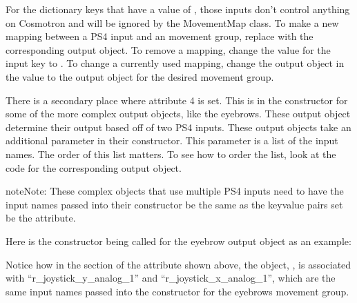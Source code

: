 \documentclass[letterpaper,10pt,english]{sphinxmanual}
\begin{document}
\sphinxAtStartPar
For the dictionary keys that have a value of , those inputs
don’t control anything on Cosmotron and will be ignored by the
MovementMap class. To make a new mapping between a PS4 input and an
movement group, replace  with the corresponding output object.
To remove a mapping, change the value for the input key to .
To change a currently used mapping, change the output object in the
value to the output object for the desired movement group.

\sphinxAtStartPar
There is a secondary place where attribute 4 is set. This is in the
constructor for some of the more complex output objects, like the
eyebrows. These output object determine their output based off of
two PS4 inputs. These output objects take an additional parameter in
their constructor. This parameter is a list of the input names. The
order of this list matters. To see how to order the list, look at
the code for the corresponding output object.

\begin{sphinxadmonition}{note}{Note:}
\sphinxAtStartPar
These complex objects that use multiple PS4 inputs need to
have the input names passed into their constructor be the same
as the key\sphinxhyphen{}value pairs set be the  attribute.
\end{sphinxadmonition}

\sphinxAtStartPar
Here is the constructor being called for the eyebrow output object
as an example:

\begin{sphinxVerbatim}[commandchars=\\\{\}]
    \PYG{p}{[}   \PYG{p}{]} \PYG{p}{[} \PYG{p}{]}
\end{sphinxVerbatim}

\sphinxAtStartPar
Notice how in the section of the  attribute shown above,
the object, , is associated with “r\_joystick\_y\_analog\_1”
and “r\_joystick\_x\_analog\_1”, which are the same input names passed
into the constructor for the eyebrows movement group.
\end{document}
